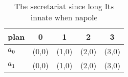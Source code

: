 \documentclass[a4paper]{article}
\begin{document}
\begin{table}
\begin{adjustbox}{width=0.7\columnwidth}
\begin{tabular}{|l|l|l|l|l|}
\hline
\textbf{plan} & \multicolumn{1}{c|}{\textbf{0}} & \multicolumn{1}{c|}{\textbf{1}} & \multicolumn{1}{c|}{\textbf{2}} & \multicolumn{1}{c|}{\textbf{3}} \\ \hline
\textbf{$a_0$}  & (0,0) & (1,0) & (2,0) & (3,0) \\ \hline
\textbf{$a_1$}  & (0,0) & (1,0) & (2,0) & (3,0) \\ \hline
\end{tabular}
\end{adjustbox}
\caption{The secretariat since long Its innate when napole
}
\end{table}
\end{document}
